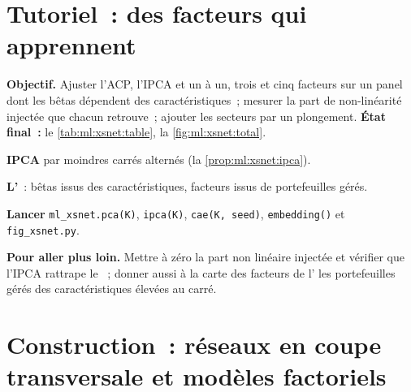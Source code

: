 \section{Tutoriel~: des facteurs qui apprennent}\label{tut:ml:cross-sectional-deep-models:tut}

\begin{tutorial}
\textbf{Objectif.} Ajuster l'ACP, l'IPCA et un  à un, trois et cinq facteurs sur un panel dont les bêtas
dépendent des caractéristiques~; mesurer la part de non-linéarité injectée que chacun retrouve~; ajouter les secteurs par un
plongement. \textbf{État final~:} le \cref{tab:ml:xsnet:table}, la \cref{fig:ml:xsnet:total}.
\begin{tutsteps}
\item \textbf{IPCA} par moindres carrés alternés (la \cref{prop:ml:xsnet:ipca}).
\label{lst:ml:xsnet:ipca}
\item \textbf{L'}~: bêtas issus des caractéristiques, facteurs issus de portefeuilles gérés.
\label{lst:ml:xsnet:ca}
\item \textbf{Lancer} \texttt{ml\_xsnet.pca(K)}, \texttt{ipca(K)}, \texttt{cae(K, seed)}, \texttt{embedding()} et
\texttt{fig\_xsnet.py}.
\end{tutsteps}
\textbf{Pour aller plus loin.} Mettre à zéro la part non linéaire injectée et vérifier que l'IPCA rattrape le
~; donner aussi à la carte des facteurs de l' les portefeuilles gérés des caractéristiques élevées au carré.
\end{tutorial}

\section{Construction~: réseaux en coupe transversale et modèles factoriels}\label{bld:ml:cross-sectional-deep-models:xsnet}

